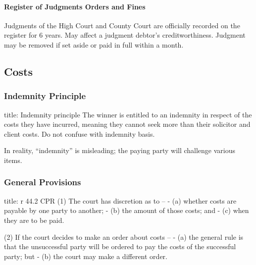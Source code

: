 \documentclass[
]{article}
\newenvironment{Shaded}{}{}
\newcommand{\NormalTok}[1]{#1}
\begin{document}
\hypertarget{register-of-judgments-orders-and-fines}{%
\paragraph{Register of Judgments Orders and
Fines}\label{register-of-judgments-orders-and-fines}}

Judgments of the High Court and County Court are officially recorded on
the register for 6 years. May affect a judgment debtor's
creditworthiness. Judgment may be removed if set aside or paid in full
within a month.

\hypertarget{costs}{%
\subsection{Costs}\label{costs}}

\hypertarget{indemnity-principle}{%
\subsubsection{Indemnity Principle}\label{indemnity-principle}}

\begin{Shaded}
\begin{Highlighting}[]
\NormalTok{title: Indemnity principle}
\NormalTok{The winner is entitled to an indemnity in respect of the costs they have incurred, meaning they cannot seek more than their solicitor and client costs. Do not confuse with indemnity basis. }
\end{Highlighting}
\end{Shaded}

In reality, ``indemnity'' is misleading; the paying party will challenge
various items.

\hypertarget{general-provisions}{%
\subsubsection{General Provisions}\label{general-provisions}}

\begin{Shaded}
\begin{Highlighting}[]
\NormalTok{title: r 44.2 CPR}
\NormalTok{(1) The court has discretion as to –}
\NormalTok{{-} (a) whether costs are payable by one party to another;}
\NormalTok{{-} (b) the amount of those costs; and}
\NormalTok{{-} (c) when they are to be paid.}

\NormalTok{(2) If the court decides to make an order about costs –}
\NormalTok{{-} (a) the general rule is that the unsuccessful party will be ordered to pay the costs of the successful party; but}
\NormalTok{{-} (b) the court may make a different order.}
\end{Highlighting}
\end{Shaded}
\end{document}
